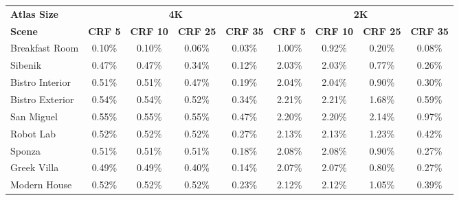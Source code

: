 \begin{table}
\scriptsize
\setlength{\tabcolsep}{2pt}
\centering
\begin{tabular}{lcccc|cccc}
\textbf{Atlas Size} & \multicolumn{4}{c|}{\textbf{4K}} & \multicolumn{4}{c}{\textbf{2K}} \\
\textbf{Scene}     & \textbf{CRF 5}       & \textbf{CRF 10}      & \textbf{CRF 25}      & \textbf{CRF 35}      & \textbf{CRF 5}       & \textbf{CRF 10}      & \textbf{CRF 25}      & \textbf{CRF 35}      \\
\hline
Breakfast Room     & 0.10\%               & 0.10\%               & 0.06\%               & 0.03\%               & 1.00\%               & 0.92\%               & 0.20\%               & 0.08\%               \\
Sibenik            & 0.47\%               & 0.47\%               & 0.34\%               & 0.12\%               & 2.03\%               & 2.03\%               & 0.77\%               & 0.26\%               \\
Bistro Interior    & 0.51\%               & 0.51\%               & 0.47\%               & 0.19\%               & 2.04\%               & 2.04\%               & 0.90\%               & 0.30\%               \\
Bistro Exterior    & 0.54\%               & 0.54\%               & 0.52\%               & 0.34\%               & 2.21\%               & 2.21\%               & 1.68\%               & 0.59\%               \\
San Miguel         & 0.55\%               & 0.55\%               & 0.55\%               & 0.47\%               & 2.20\%               & 2.20\%               & 2.14\%               & 0.97\%               \\
Robot Lab          & 0.52\%               & 0.52\%               & 0.52\%               & 0.27\%               & 2.13\%               & 2.13\%               & 1.23\%               & 0.42\%               \\
Sponza             & 0.51\%               & 0.51\%               & 0.51\%               & 0.18\%               & 2.08\%               & 2.08\%               & 0.90\%               & 0.27\%               \\
Greek Villa        & 0.49\%               & 0.49\%               & 0.40\%               & 0.14\%               & 2.07\%               & 2.07\%               & 0.80\%               & 0.27\%               \\
Modern House       & 0.52\%               & 0.52\%               & 0.52\%               & 0.23\%               & 2.12\%               & 2.12\%               & 1.05\%               & 0.39\%               \\

\end{tabular}
\end{table}
